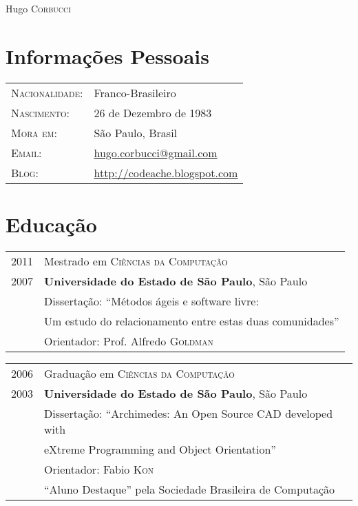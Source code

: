 \documentclass[letter,10pt]{article}
\begin{document}
\par{\centering
		{\Huge Hugo \textsc{Corbucci}
	}\bigskip\par}

\section{Informações Pessoais}

\begin{tabular}{p{2.5cm}l}
    \textsc{Nacionalidade:} & Franco-Brasileiro
    \\
    \textsc{Nascimento:} & 26 de Dezembro de 1983\\
    \textsc{Mora em:}   & São Paulo, Brasil \\
    \textsc{Email:}     &
    \href{mailto:hugo.corbucci@gmail.com}{hugo.corbucci@gmail.com}\\
    \textsc{Blog:}     &
    \href{http://codeache.blogspot.com}{http://codeache.blogspot.com}
\end{tabular}

\section{Educação}
\begin{tabular}{p{2.5cm}l}
  \textsc{2011} & Mestrado em \textsc{Ciências da Computação}\\
  \textsc{2007} & \textbf{Universidade do Estado de São Paulo}, São Paulo\\
  & Dissertação: ``Métodos ágeis e software livre:\\
  & Um estudo do relacionamento entre estas duas comunidades''\\
  & \small Orientador: Prof. Alfredo \textsc{Goldman}\\
\end{tabular}

\begin{tabular}{p{2.5cm}l}
  \textsc{2006} & Graduação em \textsc{Ciências da Computação}\\
  \textsc{2003} &\normalsize\textbf{Universidade do Estado de São Paulo}, São Paulo\\
  & Dissertação: ``Archimedes: An Open Source CAD developed with\\
  & eXtreme Programming and Object Orientation''\\
  & \small Orientador: Fabio \textsc{Kon}\\
  & ``Aluno Destaque'' pela Sociedade Brasileira de Computação\\
\end{tabular}
\end{document}
